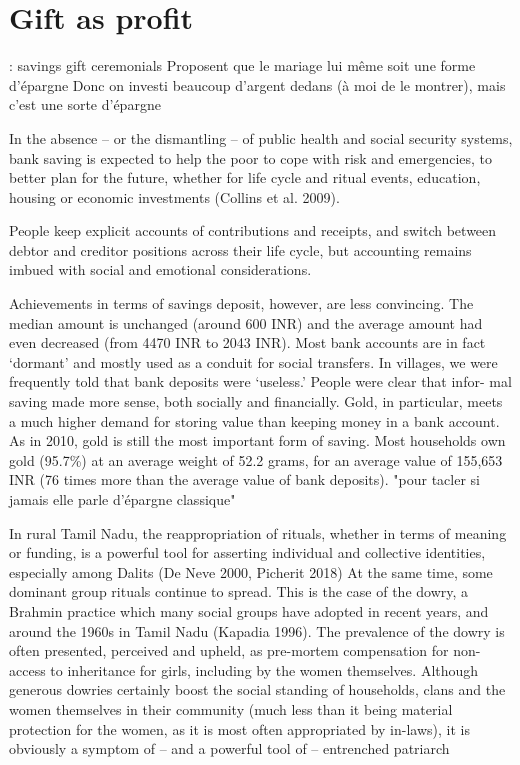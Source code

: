 \documentclass[a4paper, 11pt, onecolumn]{article}
\begin{document}
\section{Gift as profit}


\cite{Guerin2020c} : savings gift ceremonials
Proposent que le mariage lui même soit une forme d'épargne
Donc on investi beaucoup d'argent dedans (à moi de le montrer), mais c'est une sorte d'épargne

In the absence – or the dismantling – of public health and social security systems, bank saving is
expected to help the poor to cope with risk and emergencies, to better plan for the future, whether for
life cycle and ritual events, education, housing or economic investments (Collins et al. 2009).

People keep explicit accounts of contributions and
receipts, and switch between debtor and creditor positions across their life cycle, but accounting
remains imbued with social and emotional considerations.

Achievements in terms of savings deposit,
however, are less convincing. The median amount is unchanged (around 600 INR) and the average
amount had even decreased (from 4470 INR to 2043 INR). Most bank accounts are in fact ‘dormant’
and mostly used as a conduit for social transfers. 
In villages, we were frequently told that bank deposits were ‘useless.’ People were clear that infor-
mal saving made more sense, both socially and financially. Gold, in particular, meets a much higher
demand for storing value than keeping money in a bank account. As in 2010, gold is still the most
important form of saving. Most households own gold (95.7\%) at an average weight of 52.2 grams, for
an average value of 155,653 INR (76 times more than the average value of bank deposits).
"pour tacler \cite{Anukriti2020} si jamais elle parle d'épargne classique"

 In rural Tamil Nadu, the reappropriation of rituals, whether in terms of meaning or funding, is a powerful
tool for asserting individual and collective identities, especially among Dalits (De Neve 2000, Picherit
2018) At the same time, some dominant group rituals continue to spread. This is the case of the
dowry, a Brahmin practice which many social groups have adopted in recent years, and around
the 1960s in Tamil Nadu (Kapadia 1996). The prevalence of the dowry is often presented, perceived
and upheld, as pre-mortem compensation for non-access to inheritance for girls, including by the
women themselves. Although generous dowries certainly boost the social standing of households,
clans and the women themselves in their community (much less than it being material protection
for the women, as it is most often appropriated by in-laws), it is obviously a symptom of – and a
powerful tool of – entrenched patriarch
\end{document}
